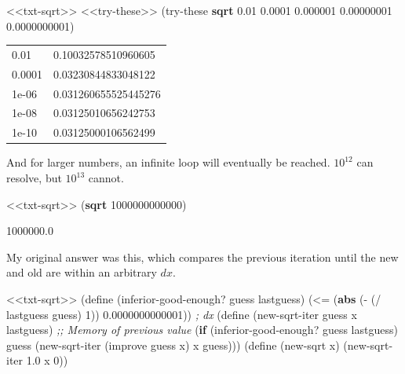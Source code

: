 \documentclass[
]{article}
\newenvironment{Shaded}{}{}
\newcommand{\CommentTok}[1]{\textcolor[rgb]{0.38,0.63,0.69}{\textit{#1}}}
\newcommand{\DecValTok}[1]{\textcolor[rgb]{0.25,0.63,0.44}{#1}}
\newcommand{\ExtensionTok}[1]{#1}
\newcommand{\FloatTok}[1]{\textcolor[rgb]{0.25,0.63,0.44}{#1}}
\newcommand{\FunctionTok}[1]{\textcolor[rgb]{0.02,0.16,0.49}{#1}}
\newcommand{\KeywordTok}[1]{\textcolor[rgb]{0.00,0.44,0.13}{\textbf{#1}}}
\newcommand{\NormalTok}[1]{#1}
\newcommand{\OperatorTok}[1]{\textcolor[rgb]{0.40,0.40,0.40}{#1}}
\begin{document}
\hypertarget{EX1-7-t1}{%
\label{EX1-7-t1}}%
\begin{Shaded}
\begin{Highlighting}[numbers=left,,]
\NormalTok{\textless{}\textless{}txt{-}sqrt\textgreater{}\textgreater{}}
\NormalTok{\textless{}\textless{}try{-}these\textgreater{}\textgreater{}}
\NormalTok{(try{-}these }\KeywordTok{sqrt} \FloatTok{0.01} \FloatTok{0.0001} \FloatTok{0.000001} \FloatTok{0.00000001} \FloatTok{0.0000000001}\NormalTok{)}
\end{Highlighting}
\end{Shaded}

\begin{longtable}[]{@{}ll@{}}
\toprule
\endhead
0.01 & 0.10032578510960605 \\
0.0001 & 0.03230844833048122 \\
1e-06 & 0.031260655525445276 \\
1e-08 & 0.03125010656242753 \\
1e-10 & 0.03125000106562499 \\
\bottomrule
\end{longtable}

And for larger numbers, an infinite loop will eventually be reached.
\(10^{12}\) can resolve, but \(10^{13}\) cannot.

\begin{Shaded}
\begin{Highlighting}[numbers=left,,]
\NormalTok{\textless{}\textless{}txt{-}sqrt\textgreater{}\textgreater{}}
\NormalTok{(}\KeywordTok{sqrt} \DecValTok{1000000000000}\NormalTok{)}
\end{Highlighting}
\end{Shaded}

1000000.0

My original answer was this, which compares the previous iteration until
the new and old are within an arbitrary \(dx\).

\hypertarget{inferior-good-enough}{%
\label{inferior-good-enough}}%
\begin{Shaded}
\begin{Highlighting}[numbers=left,,]
\NormalTok{\textless{}\textless{}txt{-}sqrt\textgreater{}\textgreater{}}
\NormalTok{(}\ExtensionTok{define}\FunctionTok{ }\NormalTok{(inferior{-}good{-}enough? guess lastguess)}
\NormalTok{  (}\OperatorTok{\textless{}=}
\NormalTok{   (}\KeywordTok{abs}\NormalTok{ (}\OperatorTok{{-}}
\NormalTok{         (}\OperatorTok{/}\NormalTok{ lastguess guess)}
         \DecValTok{1}\NormalTok{))}
   \FloatTok{0.0000000000001}\NormalTok{)) }\CommentTok{; dx}
\NormalTok{(}\ExtensionTok{define}\FunctionTok{ }\NormalTok{(new{-}sqrt{-}iter guess x lastguess) }\CommentTok{;; Memory of previous value}
\NormalTok{  (}\KeywordTok{if}\NormalTok{ (inferior{-}good{-}enough? guess lastguess)}
\NormalTok{      guess}
\NormalTok{      (new{-}sqrt{-}iter (improve guess x) x guess)))}
\NormalTok{(}\ExtensionTok{define}\FunctionTok{ }\NormalTok{(new{-}sqrt x)}
\NormalTok{  (new{-}sqrt{-}iter }\FloatTok{1.0}\NormalTok{ x }\DecValTok{0}\NormalTok{))}
\end{Highlighting}
\end{Shaded}
\end{document}

